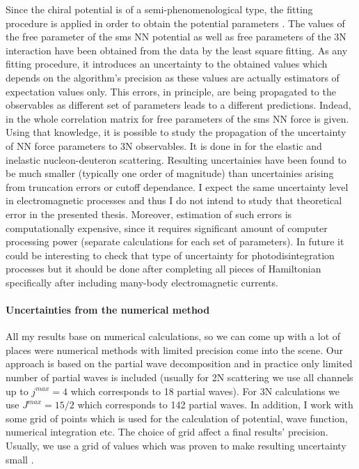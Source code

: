     Since the chiral potential is of a semi-phenomenological type, the fitting procedure is applied
    in order to obtain the potential parameters \cite{reinkrebs2018}. 
    The values of the free parameter of the \gls{sms} NN potential as well as free
    parameters of the  3N  interaction  have been  obtained  from the data  by the least square fitting.
    As any fitting procedure, it 
    introduces an uncertainty to the obtained values which depends on the algorithm's precision as
    these values are actually estimators of expectation values only.
    This errors, in principle, are being propagated to the observables as different set of parameters
    leads to a different predictions.
    Indead, in \cite{reinkrebs2018} the whole correlation matrix for free parameters of the  \gls{sms} NN
    force is given. Using that knowledge, it is possible to study the propagation of the uncertainty of NN
    force parameters to 3N observables. It is done in \cite{skibincki_prc_2018,Volkotrub_2020} for the
    elastic and inelastic nucleon-deuteron scattering.
    Resulting uncertainies have been found to be much smaller (typically one order of magnitude)
    than uncertainies arising from truncation errors or cutoff dependance.
    I expect  the same uncertainty level in electromagnetic processes and thus I do not
    intend to study that theoretical error in the presented thesis.
    Moreover, estimation of such errors is computationally expensive, since it requires 
    significant amount of computer processing power (separate calculations for each set of parameters).
    In future it could be interesting to check that type of uncertainty for photodisintegration
    processes but it should be done after completing all pieces of Hamiltonian 
    specifically  after including many-body  electromagnetic currents.

    \paragraph{Uncertainties from the numerical method}
    All my results base on numerical calculations,
    so we can come up with a lot of places were numerical methods with limited 
    precision come into the scene. 
    Our approach is based on the partial wave decomposition 
    and in practice only limited number of partial waves is included 
    (usually for 2N scattering we use all channels up to $j^{max}=4$ which corresponds to 18 partial waves).
    For 3N calculations we use $J^{max}=15/2$ which corresponds to 142 partial waves.
    In addition, I work with some 
    grid of points which is used for the calculation of potential, wave function, numerical integration etc. 
    The choice of grid affect
    a final results' precision. 
    Usually, we use a grid of  values which was proven to make resulting
    uncertainty small \cite{Glockle1983}.

